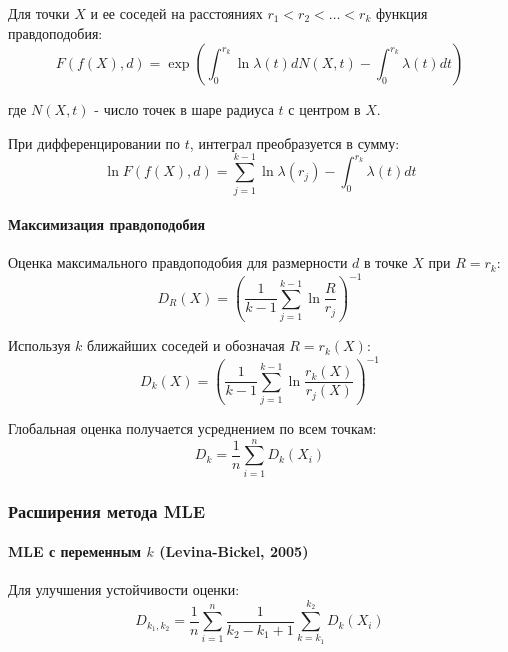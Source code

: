 \documentclass[a4paper,12pt]{article}
\begin{document}
Для точки $X$ и ее соседей на расстояниях $r_1 < r_2 < \ldots < r_k$ функция правдоподобия:
\begin{equation}
    F(f(X), d) = \exp\left(\int_0^{r_k} \ln \lambda(t) dN(X, t) - \int_0^{r_k} \lambda(t) dt\right)
\end{equation}

где $N(X, t)$ - число точек в шаре радиуса $t$ с центром в $X$.

При дифференцировании по $t$, интеграл преобразуется в сумму:
\begin{equation}
    \ln F(f(X), d) = \sum_{j=1}^{k-1} \ln\lambda(r_j) - \int_0^{r_k} \lambda(t) dt
\end{equation}

\paragraph{Максимизация правдоподобия}

Оценка максимального правдоподобия для размерности $d$ в точке $X$ при $R = r_k$:
\begin{equation}
    D_R(X) = \left(\frac{1}{k-1} \sum_{j=1}^{k-1} \ln\frac{R}{r_j} \right)^{-1}
\end{equation}

Используя $k$ ближайших соседей и обозначая $R = r_k(X)$:
\begin{equation}
    D_k(X) = \left(\frac{1}{k-1} \sum_{j=1}^{k-1} \ln\frac{r_k(X)}{r_j(X)} \right)^{-1}
\end{equation}

Глобальная оценка получается усреднением по всем точкам:
\begin{equation}
    D_k = \frac{1}{n} \sum_{i=1}^n D_k(X_i)
\end{equation}

\subsubsection{Расширения метода MLE}

\paragraph{MLE с переменным $k$ (Levina-Bickel, 2005)}

Для улучшения устойчивости оценки:
\begin{equation}
    D_{k_1, k_2} = \frac{1}{n} \sum_{i=1}^n \frac{1}{k_2 - k_1 + 1} \sum_{k=k_1}^{k_2} D_k(X_i)
\end{equation}
\end{document}
